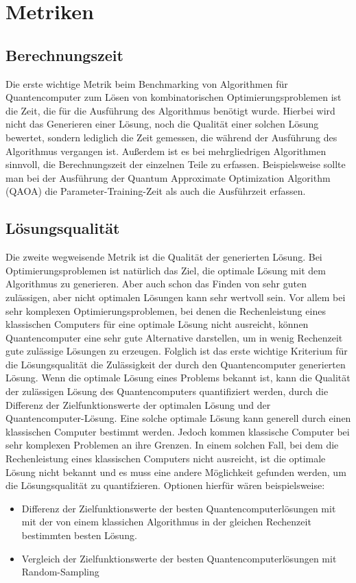\section{Metriken}

\subsection{Berechnungszeit}
Die erste wichtige Metrik beim Benchmarking von Algorithmen für Quantencomputer zum Lösen von kombinatorischen Optimierungsproblemen ist die Zeit, die für die Ausführung des Algorithmus benötigt wurde.
Hierbei wird nicht das Generieren einer Lösung, noch die Qualität einer solchen Lösung bewertet, sondern lediglich die Zeit gemessen, die während der Ausführung des Algorithmus vergangen ist.
Außerdem ist es bei mehrgliedrigen Algorithmen sinnvoll, die Berechnungszeit der einzelnen Teile zu erfassen. 
Beispielsweise sollte man bei der Ausführung der Quantum Approximate Optimization Algorithm (QAOA) die Parameter-Training-Zeit als auch die Ausführzeit erfassen.


\subsection{Lösungsqualität}
Die zweite wegweisende Metrik ist die Qualität der generierten Lösung. 
Bei Optimierungsproblemen ist natürlich das Ziel, die optimale Lösung mit dem Algorithmus zu generieren. 
Aber auch schon das Finden von sehr guten zulässigen, aber nicht optimalen Lösungen kann sehr wertvoll sein. Vor allem bei sehr komplexen Optimierungsproblemen, bei denen die Rechenleistung eines klassischen Computers für eine optimale Lösung nicht ausreicht, können Quantencomputer eine sehr gute Alternative darstellen, um in wenig Rechenzeit gute zulässige Lösungen zu erzeugen.
Folglich ist das erste wichtige Kriterium für die Lösungsqualität die Zulässigkeit der durch den Quantencomputer generierten Lösung.
Wenn die optimale Lösung eines Problems bekannt ist, kann die Qualität der zulässigen Lösung des Quantencomputers quantifiziert werden, durch die Differenz der Zielfunktionswerte der optimalen Lösung und der Quantencomputer-Lösung.
Eine solche optimale Lösung kann generell durch einen klassischen Computer bestimmt werden. Jedoch kommen klassische Computer bei sehr komplexen Problemen an ihre Grenzen. 
In einem solchen Fall, bei dem die Rechenleistung eines klassischen Computers nicht ausreicht, ist die optimale Lösung nicht bekannt und es muss eine andere Möglichkeit gefunden werden, um die Lösungsqualität zu quantifzieren.
Optionen hierfür wären beispielsweise:
\begin{itemize}
	\item Differenz der Zielfunktionswerte der besten Quantencomputerlösungen mit mit der von einem klassichen Algorithmus in der gleichen Rechenzeit bestimmten besten Lösung.
	\item Vergleich der Zielfunktionswerte der besten Quantencomputerlösungen mit Random-Sampling
\end{itemize}



